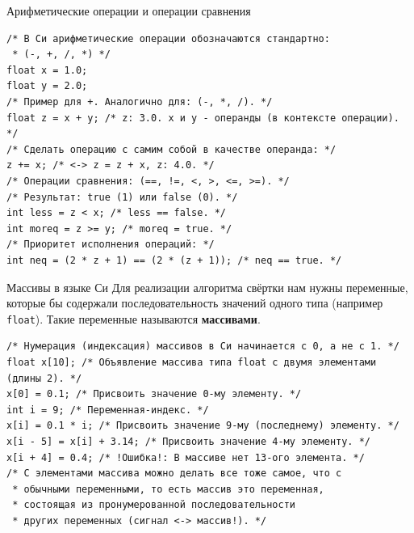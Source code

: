 \documentclass{beamer}
\begin{document}
    \begin{frame}[fragile]{Арифметические операции и операции сравнения}
        \begin{verbatim}
/* В Си арифметические операции обозначаются стандартно: 
 * (-, +, /, *) */
float x = 1.0;
float y = 2.0;
/* Пример для +. Аналогично для: (-, *, /). */
float z = x + y; /* z: 3.0. x и y - операнды (в контексте операции). */
/* Сделать операцию с самим собой в качестве операнда: */
z += x; /* <-> z = z + x, z: 4.0. */
/* Операции сравнения: (==, !=, <, >, <=, >=). */
/* Результат: true (1) или false (0). */
int less = z < x; /* less == false. */ 
int moreq = z >= y; /* moreq = true. */
/* Приоритет исполнения операций: */
int neq = (2 * z + 1) == (2 * (z + 1)); /* neq == true. */
        \end{verbatim}
    \end{frame}
    \begin{frame}[fragile]{Массивы в языке Си}
        \justifying
        Для реализации алгоритма свёртки нам нужны переменные, которые бы содержали последовательность значений одного типа (например \texttt{float}). Такие переменные называются {\bf массивами}.
        \begin{verbatim}
/* Нумерация (индексация) массивов в Си начинается с 0, а не с 1. */
float x[10]; /* Объявление массива типа float c двумя элементами (длины 2). */
x[0] = 0.1; /* Присвоить значение 0-му элементу. */
int i = 9; /* Переменная-индекс. */
x[i] = 0.1 * i; /* Присвоить значение 9-му (последнему) элементу. */
x[i - 5] = x[i] + 3.14; /* Присвоить значение 4-му элементу. */
x[i + 4] = 0.4; /* !Ошибка!: В массиве нет 13-ого элемента. */
/* C элементами массива можно делать все тоже самое, что с 
 * обычными переменными, то есть массив это переменная, 
 * состоящая из пронумерованной последовательности 
 * других переменных (сигнал <-> массив!). */
        \end{verbatim}
    \end{frame}
\end{document}
